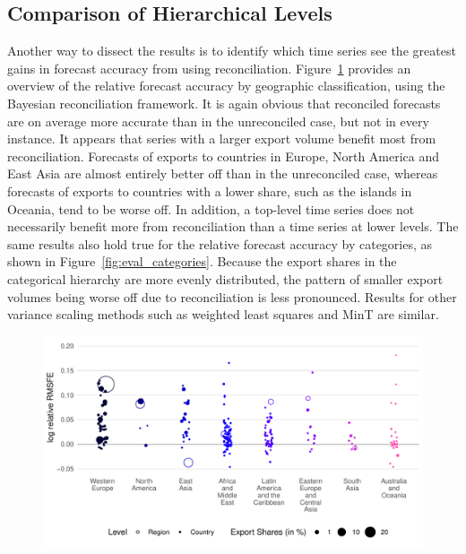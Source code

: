 \documentclass[a4paper,fleqn,11pt]{article}
\begin{document}
\subsection{Comparison of Hierarchical Levels}
Another way to dissect the results is to identify which time series see the greatest gains in forecast accuracy from using reconciliation. Figure~\ref{fig:eval_regions} provides an overview of the relative forecast accuracy by geographic classification, using the Bayesian reconciliation framework. It is again obvious that reconciled forecasts are on average more accurate than in the unreconciled case, but not in every instance. It appears that series with a larger export volume benefit most from reconciliation. Forecasts of exports to countries in Europe, North America and East Asia are almost entirely better off than in the unreconciled case, whereas forecasts of exports to countries with a lower share, such as the islands in Oceania, tend to be worse off. In addition, a top-level time series does not necessarily benefit more from reconciliation than a time series at lower levels. The same results also hold true for the relative forecast accuracy by categories, as shown in Figure~\ref{fig:eval_categories}. Because the export shares in the categorical hierarchy are more evenly distributed, the pattern of smaller export volumes being worse off due to reconciliation is less pronounced. Results for other variance scaling methods such as weighted least squares and MinT are similar.

\begin{figure}[H]
	\includegraphics[width=\textwidth]{fig/fig_eval_regions}
	\label{fig:eval_regions}
\end{figure}
\end{document}

